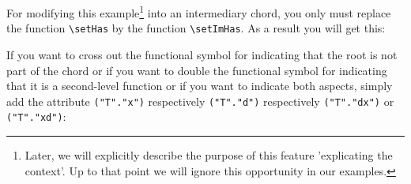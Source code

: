 \documentclass[
  DIV=calc,
  BCOR=5mm,
  12pt,
  headings=small,
  oneside,
  abstract=true,
  toc=bib,
  xcolor=dvipsnames,
  openany,
  ngerman,english]{scrartcl}
\begin{document}
\begin{center}
\end{center}

For modifying this example\footnote{Later, we will explicitly describe the
purpose of this feature 'explicating the context'. Up to that point we will
ignore this opportunity in our examples.} into an intermediary chord, you only
must replace the function \texttt{\textbackslash setHas} by the function
\texttt{\textbackslash setImHas}. As a result you will get this:

\begin{center}
\end{center}

If you want to cross out the functional symbol for indicating that the root is
not part of the chord or if you want to double the functional symbol for
indicating that it is a second-level function or if you want to indicate both
aspects, simply add the attribute \verb|("T"."x")| respectively
\verb|("T"."d")| respectively \verb|("T"."dx")| or \verb|("T"."xd")|:
\end{document}
